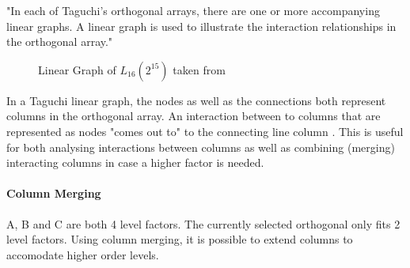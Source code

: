 "In each of Taguchi’s orthogonal arrays, there are one or more accompanying linear graphs. A linear graph is used to illustrate the interaction relationships in the orthogonal array."\cite{yang_design_2009}

\begin{figure}[H]
	\label{figure:hyperparameter_tuning:linear_graph}
	\centering
{}
\caption{ Linear Graph of $L_{16}(2^{15})$ taken from \cite{yang_design_2009}}
\end{figure}


In a Taguchi linear graph, the nodes as well as the connections both represent columns in the orthogonal array. An interaction between to columns that are represented as nodes "comes out to" to the connecting line column \cite{taguchi_taguchis_2005}. This is useful for both analysing interactions between columns as well as combining (merging) interacting columns in case a higher factor is needed.

\paragraph{Column Merging}
A, B and C are both 4 level factors. The currently selected orthogonal only fits 2 level factors. Using column merging, it is possible to extend columns to accomodate higher order levels. 

